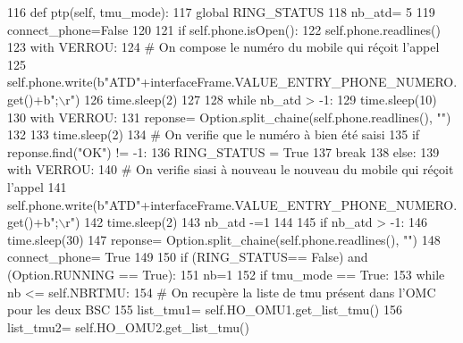 \begin{DoxyCode}
116     \textcolor{keyword}{def }ptp(self, tmu\_mode):
117         \textcolor{keyword}{global} RING\_STATUS
118         nb\_atd= 5
119         connect\_phone=\textcolor{keyword}{False}
120 
121         \textcolor{keywordflow}{if} self.phone.isOpen():
122             self.phone.readlines()
123             with VERROU:
124                 \textcolor{comment}{# On compose le numéro du mobile qui réçoit l'appel
}
125                 self.phone.write(b\textcolor{stringliteral}{"ATD"}+interfaceFrame.VALUE\_ENTRY\_PHONE\_NUMERO.get()+b\textcolor{stringliteral}{";\(\backslash\)r"})
126                 time.sleep(2)
127 
128             \textcolor{keywordflow}{while} nb\_atd > -1:
129                 time.sleep(10)
130                 with VERROU:
131                     reponse= Option.split\_chaine(self.phone.readlines(), \textcolor{stringliteral}{""})
132 
133                     time.sleep(2)
134                 \textcolor{comment}{# On verifie que le numéro à bien été saisi 
}
135                 \textcolor{keywordflow}{if} reponse.find(\textcolor{stringliteral}{"OK"}) != -1:
136                     RING\_STATUS = \textcolor{keyword}{True}
137                     \textcolor{keywordflow}{break}
138                 \textcolor{keywordflow}{else}:
139                     with VERROU:
140                         \textcolor{comment}{# On verifie siasi à nouveau le nouveau du mobile qui réçoit l'appel
}
141                         self.phone.write(b\textcolor{stringliteral}{"ATD"}+interfaceFrame.VALUE\_ENTRY\_PHONE\_NUMERO.get()+b\textcolor{stringliteral}{";\(\backslash\)r"})
142                         time.sleep(2)
143                 nb\_atd -=1
144             
145             \textcolor{keywordflow}{if} nb\_atd > -1:
146                 time.sleep(30)
147                 reponse= Option.split\_chaine(self.phone.readlines(), \textcolor{stringliteral}{""})
148                 connect\_phone= \textcolor{keyword}{True}
149 
150                 \textcolor{keywordflow}{if} (RING\_STATUS== \textcolor{keyword}{False}) \textcolor{keywordflow}{and} (Option.RUNNING == \textcolor{keyword}{True}):
151                     nb=1
152                     \textcolor{keywordflow}{if} tmu\_mode == \textcolor{keyword}{True}:
153                         \textcolor{keywordflow}{while} nb <= self.NBRTMU:
154                             \textcolor{comment}{# On recupère la liste de tmu présent dans l'OMC pour les deux BSC
}
155                             list\_tmu1= self.HO\_OMU1.get\_list\_tmu()
156                             list\_tmu2= self.HO\_OMU2.get\_list\_tmu()

\end{DoxyCode}
